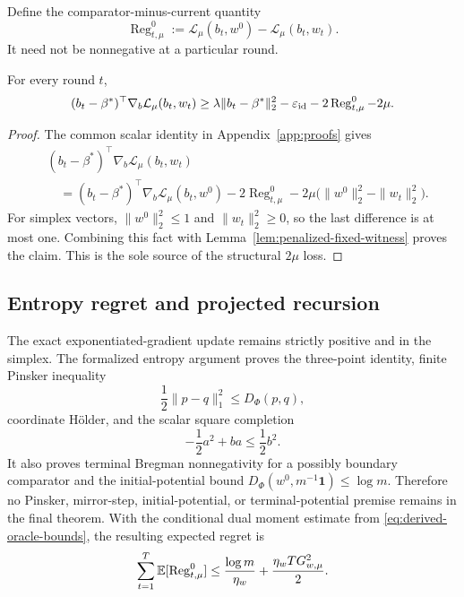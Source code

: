 Define the comparator-minus-current quantity
\begin{equation}
  \operatorname{Reg}_{t,\mu}^0
  :=\mathcal L_\mu(b_t,w^0)-\mathcal L_\mu(b_t,w_t).
  \label{eq:penalized-comparator-regret}
\end{equation}
It need not be nonnegative at a particular round.

\begin{lemma}
\label{lem:penalized-comparator-reduction}
For every round $t$,
\begin{equation}
  (b_t-\beta^*)^\top\nabla_b\mathcal L_\mu(b_t,w_t)
  \ge
  \lambda\|b_t-\beta^*\|_2^2
  -\varepsilon_{\rm id}-2\operatorname{Reg}_{t,\mu}^0-2\mu.
  \label{eq:penalized-comparator-direction}
\end{equation}
\end{lemma}

\begin{proof}
The common scalar identity in Appendix~\ref{app:proofs} gives
\begin{align*}
  &(b_t-\beta^*)^\top\nabla_b\mathcal L_\mu(b_t,w_t)\\
  &\quad=(b_t-\beta^*)^\top\nabla_b\mathcal L_\mu(b_t,w^0)
      -2\operatorname{Reg}_{t,\mu}^0
      -2\mu\bigl(\|w^0\|_2^2-\|w_t\|_2^2\bigr).
\end{align*}
For simplex vectors, $\|w^0\|_2^2\le1$ and
$\|w_t\|_2^2\ge0$, so the last difference is at most one.  Combining this
fact with Lemma~\ref{lem:penalized-fixed-witness} proves the claim.  This is
the sole source of the structural $2\mu$ loss.
\end{proof}

\subsection{Entropy regret and projected recursion}

The exact exponentiated-gradient update remains strictly positive and in the
simplex.  The formalized entropy argument proves the three-point identity,
finite Pinsker inequality
\[
  \frac12\|p-q\|_1^2\le D_\Phi(p,q),
\]
coordinate H\"older, and the scalar square completion
\[
  -\frac12a^2+ba\le\frac12b^2.
\]
It also proves terminal Bregman nonnegativity for a possibly boundary
comparator and the initial-potential bound
$D_\Phi(w^0,m^{-1}\mathbf1)\le\log m$.  Therefore no Pinsker, mirror-step,
initial-potential, or terminal-potential premise remains in the final theorem.
With the conditional dual moment estimate from
\eqref{eq:derived-oracle-bounds}, the resulting expected regret is
\begin{equation}
  \sum_{t=1}^T\mathbb{E}[\operatorname{Reg}_{t,\mu}^0]
  \le
  \frac{\log m}{\eta_w}
  +\frac{\eta_wT G_{w,\mu}^2}{2}.
  \label{eq:penalized-static-regret}
\end{equation}

